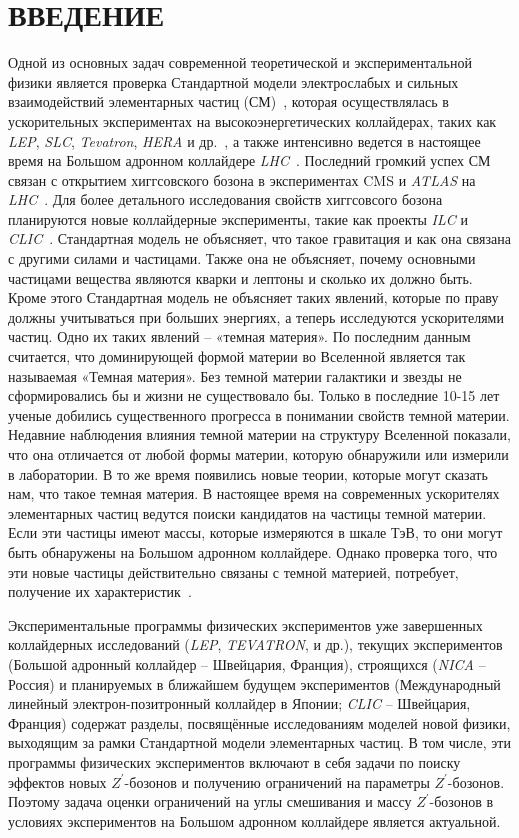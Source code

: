 \chapter*{ВВЕДЕНИЕ}
Одной из основных задач современной теоретической и экспериментальной физики является проверка Стандартной модели электрослабых и сильных взаимодействий элементарных частиц (СМ)~\cite{2part-1}, которая осуществлялась в ускорительных экспериментах на высокоэнергетических коллайдерах, таких как \textit{LEP}, \textit{SLC}, \textit{Tevatron}, \textit{HERA} и др.~\cite{sirunyan:2017}, а также интенсивно ведется в настоящее время на Большом адронном коллайдере \textit{LHC}~\cite{main-book}. Последний громкий успех СМ связан с открытием хиггсовского бозона в экспериментах CMS и \textit{ATLAS} на \textit{LHC}~\cite{Krasnikov:2004}. Для более детального исследования свойств хиггсовсого бозона планируются новые коллайдерные эксперименты, такие как проекты \textit{ILC} и \textit{CLIC}~\cite{2part-pankov}. Стандартная модель не объясняет, что такое гравитация и как она связана с другими силами и частицами. Также она не объясняет, почему основными частицами вещества являются кварки и лептоны и сколько их должно быть. Кроме этого Стандартная модель не объясняет таких явлений, которые по праву должны учитываться при больших энергиях, а теперь исследуются ускорителями частиц. Одно их таких явлений – «темная материя». По последним данным считается, что доминирующей формой материи во Вселенной является так называемая «Темная материя». Без темной материи галактики и звезды не сформировались бы и жизни не существовало бы. Только в последние 10-15 лет ученые добились существенного прогресса в понимании свойств темной материи. Недавние наблюдения влияния темной материи на структуру Вселенной показали, что она отличается от любой формы материи, которую обнаружили или измерили в лаборатории. В то же время появились новые теории, которые могут сказать нам, что такое темная материя. В настоящее время на современных ускорителях элементарных частиц ведутся поиски кандидатов на частицы темной материи. Если эти частицы имеют массы, которые измеряются в шкале ТэВ, то они могут быть обнаружены на Большом адронном коллайдере. Однако проверка того, что эти новые частицы действительно связаны с темной материей, потребует, получение их характеристик~\cite{nuclphys:weak}.

Экспериментальные программы физических экспериментов уже завершенных коллайдерных исследований (\textit{LEP}, \textit{TEVATRON}, и др.), текущих экспериментов (Большой адронный коллайдер -- Швейцария, Франция), строящихся (\textit{NICA} -- Россия) и планируемых в ближайшем будущем экспериментов (Международный линейный электрон-позитронный коллайдер в Японии; \textit{CLIC} -- Швейцария, Франция) содержат разделы, посвящённые исследованиям моделей новой физики, выходящим за рамки Стандартной модели элементарных частиц. В том числе, эти программы физических экспериментов включают в себя задачи по поиску эффектов новых ${Z}^{\prime}$-бозонов и получению ограничений на параметры ${Z}^{\prime}$-бозонов. Поэтому задача оценки ограничений на углы смешивания и массу ${Z}^{\prime}$-бозонов в условиях экспериментов на Большом адронном коллайдере является актуальной.

